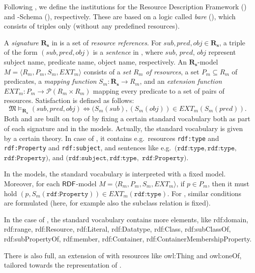 \documentclass[%
\ifpretendfinal
final%
\else
draft%
\fi,
a4paper,
wd]{isov2}
\begin{document}
\begin{definition}
Following , 
we define the institutions for the Resource Description
Framework (\RDF) and \RDF-Schema (\RDFS), respectively. 
These are based on a logic called \emph{bare} \RDF (\SimpleRDF), which consists
of triples only (without any predefined resources).

A \textit{signature} $\mathbf{R_s}$ in \SimpleRDF is a set of
\textit{resource references}. For $sub, pred, obj \in \mathbf{R_s}$, a
triple of the form $(sub, pred, obj)$ is a \textit{sentence} in \SimpleRDF,
where $sub$, $pred$, $obj$ represent subject name, predicate name,
object name, respectively. An $\mathbf{R_s}$-model $M =
\langle R_m, P_m, S_m, EXT_m \rangle$ consists of a \textit{set $R_m$
  of resources}, a set $P_m \subseteq R_m$ of predicates, a
\textit{mapping function} $S_m:\mathbf{R_s} \rightarrow R_m$, and an
\textit{extension function} $EXT_m: P_m \rightarrow \mathcal{P}(R_m
\times R_m)$ mapping every predicate to a set of pairs of
resources. Satisfaction is defined as follows:
%
\[\mathfrak{M} \models_{\mathbf{R_s}} (sub, pred, obj) \Leftrightarrow (S_{m}(sub),
(S_{m}(obj)) \in EXT_{m} (S_m(pred)). \]
%
Both \RDF and \RDFS are built on top of \SimpleRDF by fixing a certain
standard vocabulary both as part of each signature and in the models.
Actually, the standard vocabulary is given by a certain theory. In case
of \RDF, it contains e.g.\ resources \texttt{rdf:type} and
\texttt{rdf:Property} and \texttt{rdf:subject}, and sentences like e.g.\
$(\texttt{rdf:type},\texttt{rdf:type},$ $ \texttt{rdf:Property})$, and $(\texttt{rdf:subject}, \texttt{rdf:type},$  $\texttt{rdf:Property})$.

In the models, the standard vocabulary is interpreted with a fixed
model.  Moreover, for each $\mathsf{RDF}$-model $M = \langle R_m, P_m, S_m,
EXT_m \rangle$, if $p\in P_m$, then it must hold
$(p,S_m(\texttt{rdf:Property}))\in EXT_m(\texttt{rdf:type})$.
For \RDFS, similar conditions are formulated (here, for example also
the subclass relation is fixed).


In the case of \RDFS, the standard vocabulary contains more elements,
like
rdf:domain,
rdf:range, rdf:Resource, rdf:Literal, rdf:Datatype, rdf:Class,
rdf:subClassOf, rdf:subPropertyOf, rdf:member, rdf:Container,
rdf:ContainerMembershipProperty.

There is also \OWL full, an extension of \RDFS with resources
like owl:Thing and owl:oneOf, tailored towards the representation of
\OWL.

\end{definition}
\end{document}
